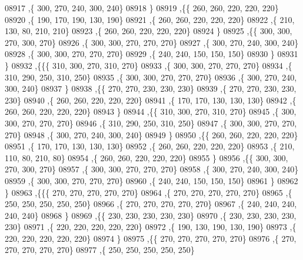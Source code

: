 \begin{DoxyCode}
08917     ,\{   300,   270,   240,   300,   240\}
08918     \}
08919    ,\{\{   260,   260,   220,   220,   220\}
08920     ,\{   190,   170,   190,   130,   190\}
08921     ,\{   260,   260,   220,   220,   220\}
08922     ,\{   210,   130,    80,   210,   210\}
08923     ,\{   260,   260,   220,   220,   220\}
08924     \}
08925    ,\{\{   300,   300,   270,   300,   270\}
08926     ,\{   300,   300,   270,   270,   270\}
08927     ,\{   300,   270,   240,   300,   240\}
08928     ,\{   300,   300,   270,   270,   270\}
08929     ,\{   240,   240,   150,   150,   150\}
08930     \}
08931    \}
08932   ,\{\{\{   310,   300,   270,   310,   270\}
08933     ,\{   300,   300,   270,   270,   270\}
08934     ,\{   310,   290,   250,   310,   250\}
08935     ,\{   300,   300,   270,   270,   270\}
08936     ,\{   300,   270,   240,   300,   240\}
08937     \}
08938    ,\{\{   270,   270,   230,   230,   230\}
08939     ,\{   270,   270,   230,   230,   230\}
08940     ,\{   260,   260,   220,   220,   220\}
08941     ,\{   170,   170,   130,   130,   130\}
08942     ,\{   260,   260,   220,   220,   220\}
08943     \}
08944    ,\{\{   310,   300,   270,   310,   270\}
08945     ,\{   300,   300,   270,   270,   270\}
08946     ,\{   310,   290,   250,   310,   250\}
08947     ,\{   300,   300,   270,   270,   270\}
08948     ,\{   300,   270,   240,   300,   240\}
08949     \}
08950    ,\{\{   260,   260,   220,   220,   220\}
08951     ,\{   170,   170,   130,   130,   130\}
08952     ,\{   260,   260,   220,   220,   220\}
08953     ,\{   210,   110,    80,   210,    80\}
08954     ,\{   260,   260,   220,   220,   220\}
08955     \}
08956    ,\{\{   300,   300,   270,   300,   270\}
08957     ,\{   300,   300,   270,   270,   270\}
08958     ,\{   300,   270,   240,   300,   240\}
08959     ,\{   300,   300,   270,   270,   270\}
08960     ,\{   240,   240,   150,   150,   150\}
08961     \}
08962    \}
08963   ,\{\{\{   270,   270,   270,   270,   270\}
08964     ,\{   270,   270,   270,   270,   270\}
08965     ,\{   250,   250,   250,   250,   250\}
08966     ,\{   270,   270,   270,   270,   270\}
08967     ,\{   240,   240,   240,   240,   240\}
08968     \}
08969    ,\{\{   230,   230,   230,   230,   230\}
08970     ,\{   230,   230,   230,   230,   230\}
08971     ,\{   220,   220,   220,   220,   220\}
08972     ,\{   190,   130,   190,   130,   190\}
08973     ,\{   220,   220,   220,   220,   220\}
08974     \}
08975    ,\{\{   270,   270,   270,   270,   270\}
08976     ,\{   270,   270,   270,   270,   270\}
08977     ,\{   250,   250,   250,   250,   250\}

\end{DoxyCode}
